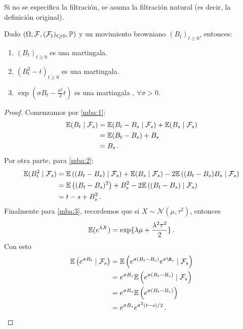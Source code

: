 Si no se especifica la filtración, se asuma la filtración natural (es decir, la definición original). 

\begin{proposition}
Dado $(\Omega, \mathcal{F},(\mathcal{F}_{t})_{t \geq 0}, \P)$ y un movimiento browniano 
$(B_{t})_{t \geq 0}$, entonces:

\begin{enumerate}
        \item \label{mba:1} $ (B_t)_{t \geq 0}$ es una martingala.
        \item \label{mba:2} $\left( B_t^2 - t \right)_{t \geq 0} $ es una martingala.
        \item \label{mba:3} $\exp\left( \sigma B_t - \frac{\sigma^2}{2}t \right) $ es una martingala
                , $\forall  \sigma >0$. 
\end{enumerate}
\end{proposition}

\begin{proof}
\gris
Comenzamos por \ref{mba:1}: 
\begin{align*}
    \E(B_t \mid \mathcal{F}_s ) &= \E (B_t - B_s \mid \mathcal{F}_s)
        + \E(B_s \mid \mathcal{F}_s) \\
        &= \E(B_t - B_s) + B_s \\ 
        &= B_s \,.
\end{align*}
Por otra parte, para \ref{mba:2}: 
\begin{align*}
\E(B_t^2 \mid \mathcal{F}_s) 
&=  \E \left( (B_{t} - B_{s}) \mid \mathcal{F}_s \right) + \E(B_s \mid
\mathcal{F}_s) - 2 \E \left( (B_t - B_s)B_s \mid \mathcal{F}_s \right) \\ 
&= \E\left( (B_t - B_s)^2 \right) + B_s^2 -2 \E \left((B_t - B_s) \mid \mathcal{F}_s\right)\\
&= t - s + B_s^2\,.
\end{align*}
Finalmente para \ref{mba:3}, recordemos que si $X \sim \mathcal{N}(\mu, \tau^2)$, entonces 
\begin{equation*}
        \E (e^{\lambda X}) = \exp\{\lambda \mu + \frac{\lambda^2 \tau^2}{2}\}\,.
\end{equation*}
Con esto 
\begin{align*}
        \E \left( e^{\sigma B_t} \mid \mathcal{F}_s \right) 
        &= \E \left( e^{\sigma (B_t - B_s)} e^{\sigma \B_s} \mid \mathcal{F}_s\right) \\
        &= e^{\sigma B_s} \E \left(e^{\sigma(B_t - B_s)} \mid \mathcal{F}_s\right) \\ 
        &= e^{\sigma B_s} \E \left( e^{\sigma(B_t - B_s)} \right) \\ 
        &= e^{\sigma B_s} e^{\sigma^2(t-s)/2}\,.
\end{align*}
\findem
\negro
\end{proof}

